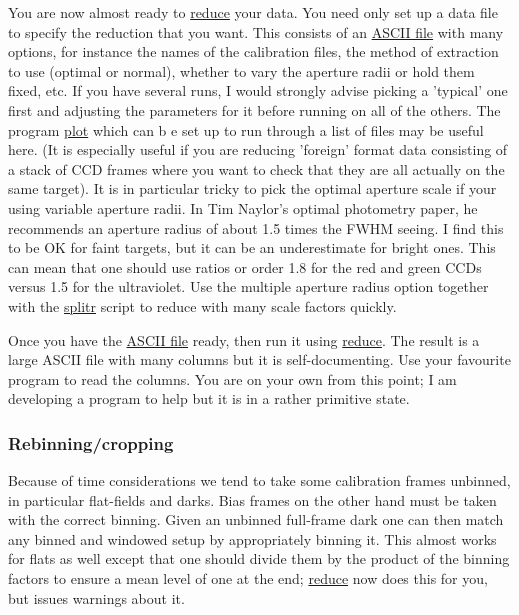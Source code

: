 \documentclass[10pt,a4paper,twocolumn]{article}
\newcommand{\main}{http://quetzel.csc.warwick.ac.uk/phsaap/software}
\newcommand{\ultracam}{\main/ultracam/html}
\begin{document}
You are now almost ready to \href{\ultracam/reduce.html}{reduce} your
data.  You need only set up a data file to specify the reduction that
you want. This consists of an \href{\ultracam/reduce.red}{ASCII file}
with many options, for instance the names of the calibration files,
the method of extraction to use (optimal or normal), whether to vary
the aperture radii or hold them fixed, etc. If you have several runs,
I would strongly advise picking a 'typical' one first and adjusting
the parameters for it before running on all of the others. The program
\href{\ultracam/plot.html}{plot} which can b e set up to run through a
list of files may be useful here. (It is especially useful if you are
reducing 'foreign' format data consisting of a stack of CCD frames
where you want to check that they are all actually on the same
target). It is in particular tricky to pick
the optimal aperture scale if your using variable aperture radii.  In
Tim Naylor's optimal photometry paper, he recommends an aperture
radius of about 1.5 times the FWHM seeing. I find this to be OK for
faint targets, but it can be an underestimate for bright ones. This
can mean that one should use ratios or order 1.8 for the red and green
CCDs versus 1.5 for the ultraviolet. Use the multiple aperture radius
option together with the \href{\ultracam/splitr.html}{splitr} script
to reduce with many scale factors quickly.

Once you have the \href{\ultracam/reduce.red}{ASCII file} ready, then run it
using \href{\ultracam/reduce.html}{reduce}. The result is a large ASCII file
with many columns but it is self-documenting. Use your favourite program to
read the columns. You are on your own from this point; I am developing a program
to help but it is in a rather primitive state.

\subsubsection{Rebinning/cropping}

Because of time considerations we tend to take some calibration frames
unbinned, in particular flat-fields and darks. Bias frames on the
other hand must be taken with the correct binning. Given an unbinned
full-frame dark one can then match any binned and windowed setup by
appropriately binning it. This almost works for flats as well except
that one should divide them by the product of the binning factors to
ensure a mean level of one at the end;
\href{\ultracam/reduce.html}{reduce} 
now does this for you, but issues
warnings about it.
\end{document}
